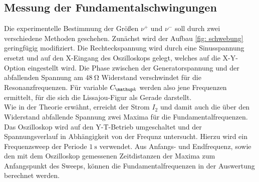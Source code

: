 \subsection{Messung der Fundamentalschwingungen}
Die experimentelle Bestimmung der Größen $\nu^+$ und $\nu^-$ soll durch zwei verschiedene Methoden geschehen. Zunächst wird der Aufbau \ref{fig: schwebung}
geringfügig modifiziert. Die Rechteckspannung wird durch eine Sinusspannung ersetzt und auf den X-Eingang des Oszilloskops gelegt, welches auf die X-Y-Option
eingestellt wird. Die Phase zwischen
der Generatorspannung und der abfallenden Spannung am $\SI{48}{\ohm}$ Widerstand verschwindet für die Resonanzfrequenzen. Für variable $C\ua{k}$ werden
also jene Frequenzen ermittelt, für die sich die Lissajou-Figur als Gerade darstellt.\\
Wie in der Theorie erwähnt, erreicht der Strom $I_2$ und damit auch die über den Widerstand abfallende Spannung zwei Maxima für die Fundamentalfrequenzen.
Das Oszilloskop wird auf den Y-T-Betrieb umgeschaltet und der Spannungsverlauf in Abhängigkeit von der Frequnz untersucht. Hierzu wird ein Frequenzsweep
der Periode $\SI{1}{\second}$ verwendet. Aus Anfangs- und Endfrequenz, sowie den mit dem Oszilloskop gemessenen Zeitdistanzen der Maxima zum Anfangspunkt
des Sweeps, können die Fundamentalfrequenzen in der Auswertung berechnet werden. 
